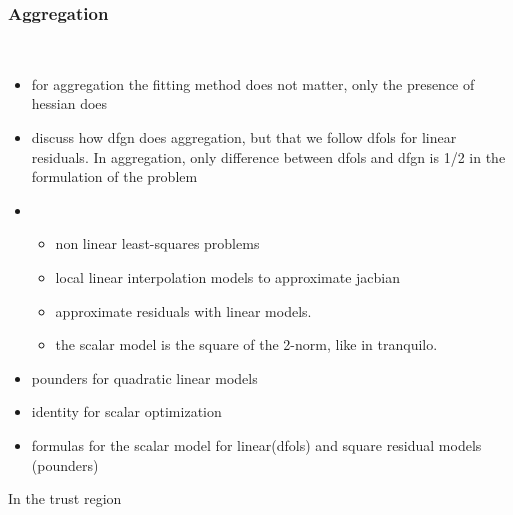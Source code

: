 \subsubsection{Aggregation}
\label{subsubsec:aggregation}
\hfill\\


\begin{itemize}
    \item for aggregation the fitting method does not matter, only the presence of hessian does
    \item discuss how dfgn does aggregation, but that we follow dfols for linear residuals. In aggregation, only difference between dfols and dfgn is 1/2 in the formulation of the problem
    \item

    \begin{itemize}
        \item non linear least-squares problems
        \item local linear interpolation models to approximate jacbian
        \item approximate residuals with linear models.
        \item the scalar model is the square of the 2-norm, like in tranquilo.
    \end{itemize}
    \item pounders for quadratic linear models
    \item identity for scalar optimization
    \item formulas for the scalar model for linear(dfols) and square residual models (pounders)
\end{itemize}

In the trust region
